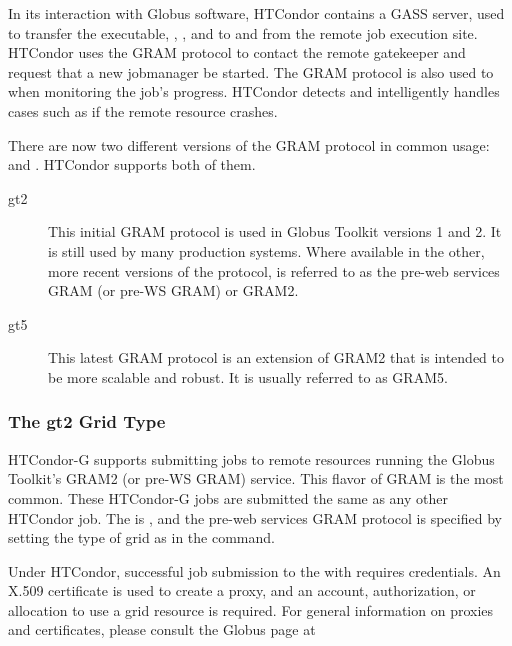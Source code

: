 In its interaction with Globus software,
HTCondor contains a GASS server, used to transfer the executable,
, , and  to and from
the remote job execution site.
HTCondor uses the GRAM protocol to contact the remote gatekeeper
and request that a new jobmanager be started.
The GRAM protocol is also used to when monitoring the job's progress.
HTCondor detects and intelligently handles cases
such as if the remote resource crashes.

There are now two different versions of the GRAM protocol in common
usage:  and .
HTCondor supports both of them.
\begin{description}
\item[gt2]
This initial GRAM protocol is used in Globus Toolkit versions 1 and 2.
It is still used by many production systems.
Where available in the other, more recent versions of the protocol,
 is referred to as the pre-web services GRAM 
(or pre-WS GRAM) or GRAM2.

\item[gt5]
This latest GRAM protocol is an extension of GRAM2 that is intended to
be more scalable and robust. It is usually referred to as GRAM5.
\end{description}

\subsubsection{\label{sec:Using-gt2}The gt2 Grid Type}

HTCondor-G supports submitting jobs to remote resources running
the Globus Toolkit's GRAM2 (or pre-WS GRAM) service. This flavor of GRAM
is the most common.
These HTCondor-G jobs are submitted the same as any other HTCondor job.
The  is ,
and the pre-web services GRAM protocol is specified by
setting the type of grid as  in the 
command.

Under HTCondor, successful job submission to the  
 with 
requires credentials.
An X.509 certificate is used to create a proxy,
and an account, authorization, or allocation to use a grid resource
is required.
For general information on proxies and certificates,
please consult the Globus page at 

